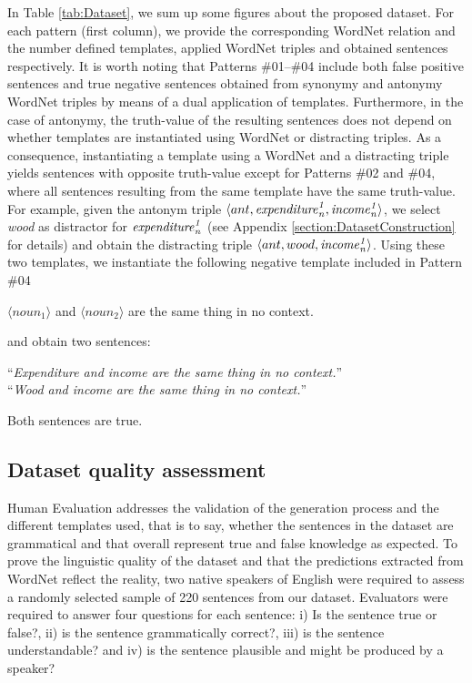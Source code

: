 \documentclass[11pt]{article}
\newcommand{\WORDNET}{WordNet}
\newcommand{\synset}[3]{{\it{#1}_{#3}^{#2}}}
\begin{document}
In Table \ref{tab:Dataset}, we sum up some figures about the proposed dataset. For each pattern (first column), we provide the corresponding \WORDNET{} relation and the number defined templates, applied \WORDNET{} triples and obtained sentences respectively. It is worth noting that Patterns \#01--\#04 include both false positive sentences and true negative sentences obtained from synonymy and antonymy \WORDNET{} triples by means of a dual application of templates. Furthermore, in the case of antonymy, the truth-value of the resulting sentences does not depend on whether templates are instantiated using \WORDNET{} or distracting triples. As a consequence, instantiating a template using a \WORDNET{} and a distracting triple yields sentences with opposite truth-value except for Patterns \#02 and \#04, where all sentences resulting from the same template have the same truth-value. For example, given the antonym triple $\langle ant, \synset{expenditure}{1}{n}, \synset{income}{1}{n} \rangle$, we select {\it wood} as distractor for 
$\synset{expenditure}{1}{n}$ (see Appendix \ref{section:DatasetConstruction} for details) and obtain the distracting triple $\langle ant, wood, \synset{income}{1}{n} \rangle$. Using these two templates, we instantiate the following negative template included in Pattern \#04
\begin{center}
$\langle noun_1 \rangle$ and $\langle noun_2 \rangle$ are the same thing in no context.
\end{center}
and obtain two sentences:
\begin{center}
``{\it Expenditure and income are the same thing in no context.}'' \\[5pt]
``{\it Wood and income are the same thing in no context.}''
\end{center}
Both sentences are true.



\subsection{Dataset quality assessment} \label{sec:dataquality}
Human Evaluation addresses the validation of the generation process and the different templates used, that is to say, whether the sentences in the dataset are grammatical and that overall represent true and false knowledge as expected. To prove the linguistic quality of the dataset and that the predictions extracted from \WORDNET{} reflect the reality, two native speakers of English were required to assess a randomly selected sample of 220 sentences from our dataset. Evaluators were required to answer four questions for each sentence: i) Is the sentence true or false?, ii) is the sentence grammatically correct?, iii) is the sentence understandable? and iv) is the sentence plausible and might be produced by a speaker?
\end{document}

